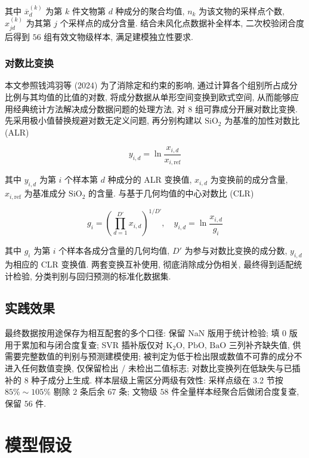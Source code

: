 \documentclass{ctexart}
\begin{document}
其中 $\overline{x}_d^{\left(k\right)}$ 为第 $k$ 件文物第 $d$ 种成分的聚合均值, $n_k$ 为该文物的采样点个数, $x_{jd}^{\left(k\right)}$ 为其第 $j$ 个采样点的成分含量. 结合未风化点数据补全样本, 二次校验闭合度后得到 $56$ 组有效文物级样本, 满足建模独立性要求.


\subsubsection{对数比变换}

本文参照钱鸿羽等 (2024) \cite{qianhongyu2024}为了消除定和约束的影响, 通过计算各个组别所占成分比例与其均值的比值的对数, 将成分数据从单形空间变换到欧式空间, 从而能够应用经典统计方法解决成分数据问题的处理方法, 对 $8$ 组可靠成分开展对数比变换. 先采用极小值替换规避对数无定义问题, 再分别构建以 $\mathrm{SiO_2}$ 为基准的加性对数比 (ALR)

\begin{equation*}
y_{i,d}=\ln\frac{x_{i,d}}{x_{i,\mathrm{ref}}}
\end{equation*}

其中 $y_{i,d}$ 为第 $i$ 个样本第 $d$ 种成分的 ALR 变换值, $x_{i,d}$ 为变换前的成分含量, $x_{i,\mathrm{ref}}$ 为基准成分 $\mathrm{SiO_2}$ 的含量. 与基于几何均值的中心对数比 (CLR)

\begin{equation*}
g_{i}=\left(\prod_{d=1}^{D'}x_{i,d}\right)^{1/D'},\quad{y}_{i,d}=\ln\frac{x_{i,d}}{g_{i}}
\end{equation*}

其中 $g_i$ 为第 $i$ 个样本各成分含量的几何均值, $D'$ 为参与对数比变换的成分数, $y_{i,d}$ 为相应的 CLR 变换值. 两套变换互补使用, 彻底消除成分伪相关, 最终得到适配统计检验, 分类判别与回归预测的标准化数据集.

\subsection{实践效果}

最终数据按用途保存为相互配套的多个口径: 保留 NaN 版用于统计检验; 填 $0$ 版用于累加和与闭合度复查; SVR 插补版仅对 $\mathrm{K_2O}$, $\mathrm{PbO}$, $\mathrm{BaO}$ 三列补齐缺失值, 供需要完整数值的判别与预测建模使用; 被判定为低于检出限或数值不可靠的成分不进入任何数值变换, 仅保留检出 / 未检出二值标志; 对数比变换列在低缺失与已插补的 $8$ 种子成分上生成. 样本层级上需区分两级有效性: 采样点级在 3.2 节按 $85\%\sim105\%$ 剔除 $2$ 条后余 $67$ 条; 文物级 $58$ 件全量样本经聚合后做闭合度复查, 保留 $56$ 件.

\section{模型假设}
\end{document}
